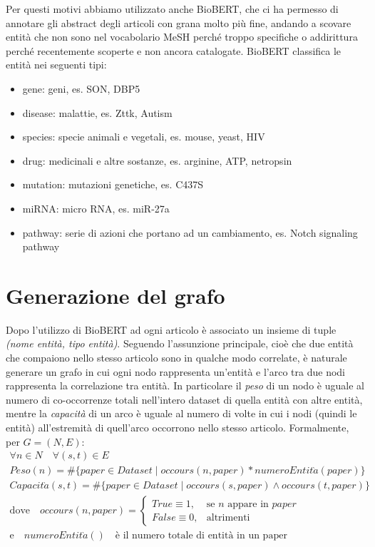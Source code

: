 \documentclass[12pt]{report}
\begin{document}
Per questi motivi abbiamo utilizzato anche BioBERT, che ci ha permesso di annotare gli abstract degli articoli con grana molto più fine, andando a scovare entità che non sono nel vocabolario MeSH perché troppo specifiche o addirittura perché recentemente scoperte e non ancora catalogate.
BioBERT classifica le entità nei seguenti tipi:
\begin{itemize}
    \item gene: geni, es. SON, DBP5
    \item disease: malattie, es. Zttk, Autism 
    \item species: specie animali e vegetali, es. mouse, yeast, HIV
    \item drug: medicinali e altre sostanze, es. arginine, ATP, netropsin
    \item mutation: mutazioni genetiche, es. C437S
    \item miRNA: micro RNA, es. miR-27a
    \item pathway: serie di azioni che portano ad un cambiamento, es. Notch signaling pathway
\end{itemize}

\section{Generazione del grafo \label{generazione_grafo}}
Dopo l'utilizzo di BioBERT ad ogni articolo è associato un insieme di tuple \textit{(nome entità, tipo entità)}. Seguendo l'assunzione principale, cioè che due entità che compaiono nello stesso articolo sono in qualche modo correlate, è naturale generare un grafo in cui ogni nodo rappresenta un'entità e l'arco tra due nodi rappresenta la correlazione tra entità. In particolare il \textit{peso} di un nodo è uguale al numero di co-occorrenze totali nell'intero dataset di quella entità con altre entità, mentre la \textit{capacità} di un arco è uguale al numero di volte in cui i nodi (quindi le entità) all'estremità di quell'arco occorrono nello stesso articolo. Formalmente, per $G=(N, E)$:
\begin{gather}
    \nonumber \forall n \in N \quad \forall (s, t) \in E \quad \\
    Peso(n) = \#\{paper \in Dataset \mid occours(n, paper) * numeroEntit\grave{a}(paper)\}\\
    Capacit\grave{a}(s, t) = \#\{paper \in {Dataset} \mid occours(s, paper) \land occours(t, paper)\}\\
    \nonumber \mbox{dove} \quad occours(n, paper) = \begin{cases} True \equiv 1, & \mbox{se } n\mbox{ appare in } paper \\ False \equiv 0, & \mbox{altrimenti} \end{cases} \\
    \nonumber \mbox{e} \quad numeroEntit\grave{a}() \quad \mbox{è il numero totale di entità in un paper}
\end{gather}
\end{document}

